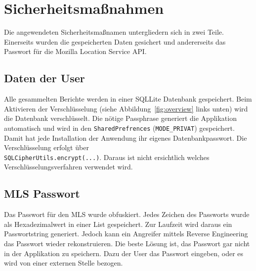 \section{Sicherheitsmaßnahmen}

Die angewendeten Sicherheitsmaßnamen untergliedern sich in zwei Teile. Einerseits wurden die gespeicherten Daten gesichert und andererseits das Passwort für die Mozilla Location Service API.

\subsection{Daten der User}
Alle gesammelten Berichte werden in einer SQLLite Datenbank gespeichert. Beim Aktivieren der Verschlüsselung (siehe Abbildung~\ref{fig:overview} links unten) wird die Datenbank verschlüsselt. Die nötige Passphrase generiert die Applikation automatisch und wird in den \texttt{SharedPrefrences} (\texttt{MODE\_PRIVAT}) gespeichert. Damit hat jede Installation der Anwendung ihr eigenes Datenbankpasswort. Die Verschlüsselung erfolgt über \\ \texttt{SQLCipherUtils.encrypt(...)}. Daraus ist nicht ersichtlich welches Verschlüsselungsverfahren verwendet wird.

\subsection{MLS Passwort}
Das Passwort für den MLS wurde obfuskiert. Jedes Zeichen des Passworts wurde als Hexadezimalwert in einer List gespeichert. Zur Laufzeit wird daraus ein  Passwortstring generiert. Jedoch kann ein Angreifer mittels Reverse Engineering das Passwort wieder rekonstruieren. Die beste Lösung ist, das Passwort gar nicht in der Applikation zu speichern. Dazu der User das Passwort eingeben, oder es wird von einer externen Stelle bezogen.